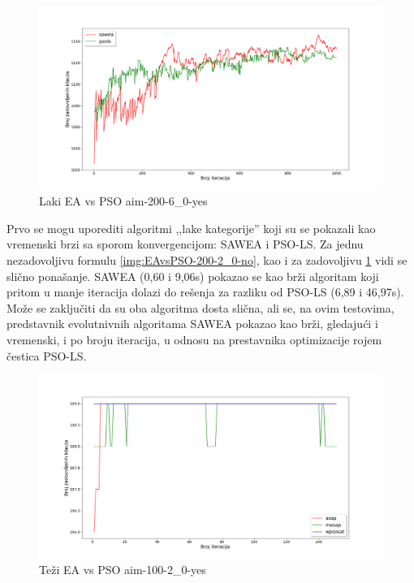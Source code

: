 \documentclass[a4paper]{article}
\begin{document}
\begin{figure}[h!]
\centering
\includegraphics[width=\textwidth]{ea-pso-aim-200-6_0-yes.png}
\caption{Laki EA vs PSO aim-200-6\_0-yes}\label{img:EAvsPSO-200-6_0-yes}
\end{figure}

Prvo se mogu uporediti algoritmi ,,lake kategorije'' koji su se pokazali kao 
vremenski brzi sa sporom konvergencijom: SAWEA i PSO-LS. Za jednu nezadovoljivu formulu
\ref{img:EAvsPSO-200-2_0-no}, kao i za zadovoljivu \ref{img:EAvsPSO-200-6_0-yes} vidi se 
slično ponašanje. SAWEA (0,60 i 9,06s) pokazao se kao brži algoritam koji pritom 
u manje iteracija dolazi do rešenja za razliku od PSO-LS (6,89 i 46,97s). \\

Može se zaključiti da su oba algoritma dosta slična, ali se, na ovim testovima, predstavnik
evolutnivnih algoritama SAWEA pokazao kao brži, gledajući i vremenski, 
i po broju iteracija, u odnosu na prestavnika optimizacije rojem čestica PSO-LS.\\

\begin{figure}[h!]
\centering
\includegraphics[width=\textwidth]{ea-pso-aim-100-2_0-yes.png}
\caption{Teži EA vs PSO aim-100-2\_0-yes}\label{img:EAvsPSO-100-2_0-yes}
\end{figure}
\end{document}
